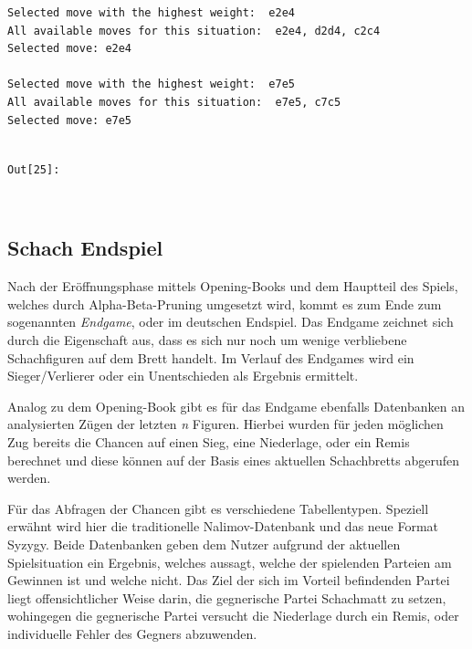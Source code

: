     \begin{Verbatim}[commandchars=\\\{\}]
Selected move with the highest weight:  e2e4
All available moves for this situation:  e2e4, d2d4, c2c4
Selected move: e2e4

Selected move with the highest weight:  e7e5
All available moves for this situation:  e7e5, c7c5
Selected move: e7e5


    \end{Verbatim}
\texttt{\color{outcolor}Out[{\color{outcolor}25}]:}
    
    \begin{center}
    \end{center}
    { \hspace*{\fill} \\}
    

    \subsection{Schach Endspiel}\label{chess-endgame}

Nach der Eröffnungsphase mittels Opening-Books und dem Hauptteil des
Spiels, welches durch Alpha-Beta-Pruning umgesetzt wird, kommt es zum
Ende zum sogenannten \emph{Endgame}, oder im deutschen Endspiel. Das
Endgame zeichnet sich durch die Eigenschaft aus, dass es sich nur noch
um wenige verbliebene Schachfiguren auf dem Brett handelt. Im Verlauf
des Endgames wird ein Sieger/Verlierer oder ein Unentschieden als
Ergebnis ermittelt.

Analog zu dem Opening-Book gibt es für das Endgame ebenfalls Datenbanken
an analysierten Zügen der letzten \emph{n} Figuren. Hierbei wurden für
jeden möglichen Zug bereits die Chancen auf einen Sieg, eine Niederlage,
oder ein Remis berechnet und diese können auf der Basis eines aktuellen
Schachbretts abgerufen werden.

Für das Abfragen der Chancen gibt es verschiedene Tabellentypen.
Speziell erwähnt wird hier die traditionelle Nalimov-Datenbank\cite{Chessprogramming.org2019} und das
neue Format Syzygy\cite{Chessprogramming.org2019a}. Beide Datenbanken geben dem Nutzer aufgrund der
aktuellen Spielsituation ein Ergebnis, welches aussagt, welche der
spielenden Parteien am Gewinnen ist und welche nicht. Das Ziel der sich
im Vorteil befindenden Partei liegt offensichtlicher Weise darin, die
gegnerische Partei Schachmatt zu setzen, wohingegen die gegnerische
Partei versucht die Niederlage durch ein Remis, oder individuelle Fehler
des Gegners abzuwenden.


